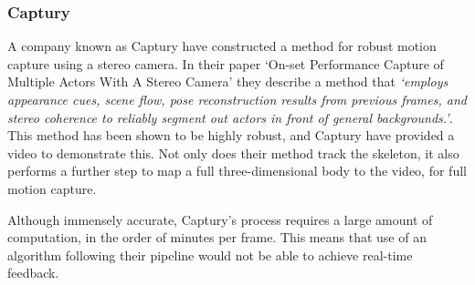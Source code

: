 \subsubsection{Captury}

A company known as Captury\cite{captury} have constructed a method for robust motion capture using a stereo camera. In their paper `On-set Performance Capture of Multiple Actors With A Stereo Camera'\cite{capturystereopaper} they describe a method that \emph{`employs appearance cues, scene flow, pose reconstruction results from previous frames, and stereo coherence to reliably segment out actors in front of general backgrounds.'}. This method has been shown to be highly robust, and Captury have provided a video\cite{capturyvideo} to demonstrate this. Not only does their method track the skeleton, it also performs a further step to map a full three-dimensional body to the video, for full motion capture.

Although immensely accurate, Captury's process requires a large amount of computation, in the order of minutes per frame. This means that use of an algorithm following their pipeline would not be able to achieve real-time feedback.